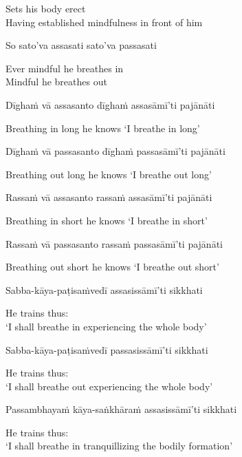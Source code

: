 \begin{cprenglish}
Sets his body erect\\
Having established mindfulness in front of him
\end{cprenglish}

So sato’va assasati sato’va passasati

\begin{cprenglish}
Ever mindful he breathes in\\
Mindful he breathes out
\end{cprenglish}

Dīghaṁ vā assasanto dīghaṁ assasāmī’ti pajānāti

\begin{cprenglish}
Breathing in long he knows ‘I breathe in long’
\end{cprenglish}

Dīghaṁ vā passasanto dīghaṁ passasāmī’ti pajānāti

\begin{cprenglish}
Breathing out long he knows ‘I breathe out long’
\end{cprenglish}

Rassaṁ vā assasanto rassaṁ assasāmī’ti pajānāti

\begin{cprenglish}
Breathing in short he knows ‘I breathe in short’
\end{cprenglish}

Rassaṁ vā passasanto rassaṁ passasāmī’ti pajānāti

\begin{cprenglish}
Breathing out short he knows ‘I breathe out short’
\end{cprenglish}

Sabba-kāya-paṭisaṁvedī assasissāmī’ti sikkhati

\begin{cprenglish}
He trains thus:\\
‘I shall breathe in experiencing the whole body’
\end{cprenglish}

Sabba-kāya-paṭisaṁvedī passasissāmī’ti sikkhati

\begin{cprenglish}
He trains thus:\\
‘I shall breathe out experiencing the whole body’
\end{cprenglish}

Passambhayaṁ kāya-saṅkhāraṁ assasissāmī’ti sikkhati

\begin{cprenglish}
He trains thus:\\
‘I shall breathe in tranquillizing the bodily formation’
\end{cprenglish}

